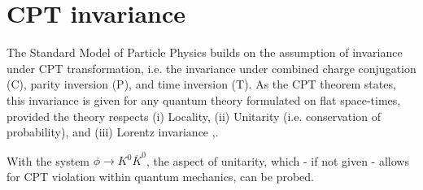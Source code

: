 \section{CPT invariance}
The Standard Model of Particle Physics builds on the assumption of invariance under CPT transformation, i.e. the invariance under combined charge conjugation (C), parity inversion (P), and time inversion (T). As the CPT theorem states, this invariance is given for any quantum theory formulated on flat space-times, provided the theory
respects (i) Locality, (ii) Unitarity (i.e. conservation of probability), and (iii) Lorentz invariance \cite{LUDERS19571},\cite{Bernabeu:2006st}.

With the system $\phi \rightarrow K^0 \overline{K}^0$, the aspect of unitarity, which - if not given - allows for CPT violation within quantum mechanics, can be probed. 
